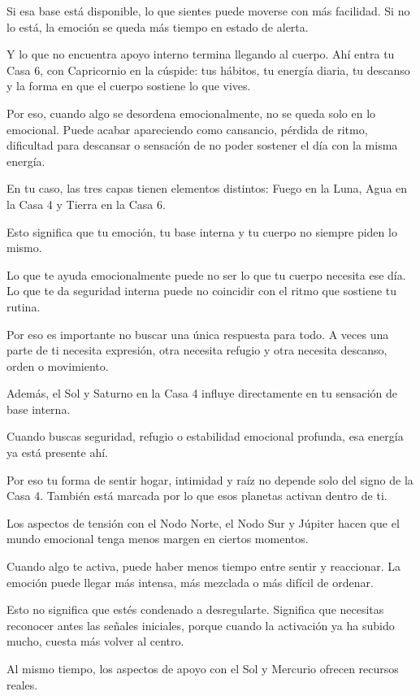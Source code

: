 \documentclass[11pt,a4paper]{article}
\begin{document}
Si esa base está disponible, lo que sientes puede moverse con más facilidad.
Si no lo está, la emoción se queda más tiempo en estado de alerta.

Y lo que no encuentra apoyo interno termina llegando al cuerpo. Ahí entra tu Casa 6, con Capricornio en la cúspide: tus hábitos, tu energía diaria, tu descanso y la forma en que el cuerpo sostiene lo que vives.

Por eso, cuando algo se desordena emocionalmente, no se queda solo en lo emocional. Puede acabar apareciendo como cansancio, pérdida de ritmo, dificultad para descansar o sensación de no poder sostener el día con la misma energía.

En tu caso, las tres capas tienen elementos distintos: Fuego en la Luna, Agua en la Casa 4 y Tierra en la Casa 6.

Esto significa que tu emoción, tu base interna y tu cuerpo no siempre piden lo mismo.

Lo que te ayuda emocionalmente puede no ser lo que tu cuerpo necesita ese día. Lo que te da seguridad interna puede no coincidir con el ritmo que sostiene tu rutina.

Por eso es importante no buscar una única respuesta para todo. A veces una parte de ti necesita expresión, otra necesita refugio y otra necesita descanso, orden o movimiento.

Además, el Sol y Saturno en la Casa 4 influye directamente en tu sensación de base interna.

Cuando buscas seguridad, refugio o estabilidad emocional profunda, esa energía ya está presente ahí.

Por eso tu forma de sentir hogar, intimidad y raíz no depende solo del signo de la Casa 4. También está marcada por lo que esos planetas activan dentro de ti.

Los aspectos de tensión con el Nodo Norte, el Nodo Sur y Júpiter hacen que el mundo emocional tenga menos margen en ciertos momentos.

Cuando algo te activa, puede haber menos tiempo entre sentir y reaccionar. La emoción puede llegar más intensa, más mezclada o más difícil de ordenar.

Esto no significa que estés condenado a desregularte. Significa que necesitas reconocer antes las señales iniciales, porque cuando la activación ya ha subido mucho, cuesta más volver al centro.

Al mismo tiempo, los aspectos de apoyo con el Sol y Mercurio ofrecen recursos reales.
\end{document}
